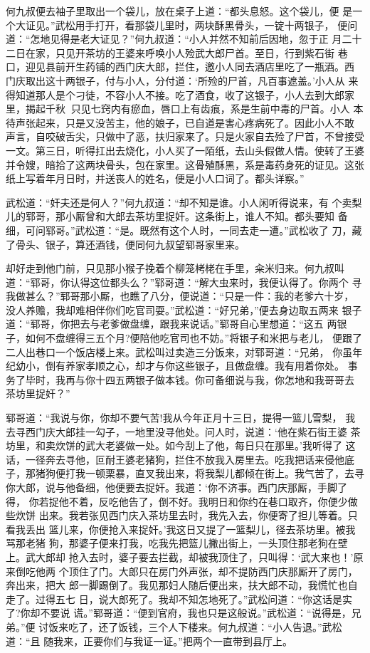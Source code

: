 何九叔便去袖子里取出一个袋儿，放在桌子上道：“都头息怒。这个袋儿，便
是一个大证见。”武松用手打开，看那袋儿里时，两块酥黑骨头，一锭十两银子，
便问道：“怎地见得是老大证见？”何九叔道：“小人并然不知前后因地，忽于正
月二十二日在家，只见开茶坊的王婆来呼唤小人殓武大郎尸首。至日，行到紫石街
巷口，迎见县前开生药铺的西门庆大郎，拦住，邀小人同去酒店里吃了一瓶酒。西
门庆取出这十两银子，付与小人，分付道：‘所殓的尸首，凡百事遮盖。’小人从
来得知道那人是个刁徒，不容小人不接。吃了酒食，收了这银子，小人去到大郎家
里，揭起千秋，只见七窍内有瘀血，唇口上有齿痕，系是生前中毒的尸首。小人
本待声张起来，只是又没苦主，他的娘子，已自道是害心疼病死了。因此小人不敢
声言，自咬破舌尖，只做中了恶，扶归家来了。只是火家自去殓了尸首，不曾接受
一文。第三日，听得扛出去烧化，小人买了一陌纸，去山头假做人情。使转了王婆
并令嫂，暗拾了这两块骨头，包在家里。这骨殖酥黑，系是毒药身死的证见。这张
纸上写着年月日时，并送丧人的姓名，便是小人口词了。都头详察。”

武松道：“奸夫还是何人？”何九叔道：“却不知是谁。小人闲听得说来，有
个卖梨儿的郓哥，那小厮曾和大郎去茶坊里捉奸。这条街上，谁人不知。都头要知
备细，可问郓哥。”武松道：“是。既然有这个人时，一同去走一遭。”武松收了
刀，藏了骨头、银子，算还酒钱，便同何九叔望郓哥家里来。

却好走到他门前，只见那小猴子挽着个柳笼栲栳在手里，籴米归来。何九叔叫
道：“郓哥，你认得这位都头么？”郓哥道：“解大虫来时，我便认得了。你两个
寻我做甚么？”郓哥那小厮，也瞧了八分，便说道：“只是一件：我的老爹六十岁，
没人养赡，我却难相伴你们吃官司耍。”武松道：“好兄弟，”便去身边取五两来
银子道：“郓哥，你把去与老爹做盘缠，跟我来说话。”郓哥自心里想道：“这五
两银子，如何不盘缠得三五个月?便陪他吃官司也不妨。”将银子和米把与老儿，
便跟了二人出巷口一个饭店楼上来。武松叫过卖造三分饭来，对郓哥道：“兄弟，
你虽年纪幼小，倒有养家孝顺之心，却才与你这些银子，且做盘缠。我有用着你处。
事务了毕时，我再与你十四五两银子做本钱。你可备细说与我，你怎地和我哥哥去
茶坊里捉奸？”

郓哥道：“我说与你，你却不要气苦!我从今年正月十三日，提得一篮儿雪梨，
我去寻西门庆大郎挂一勾子，一地里没寻他处。问人时，说道：‘他在紫石街王婆
茶坊里，和卖炊饼的武大老婆做一处。如今刮上了他，每日只在那里。’我听得了
这话，一径奔去寻他，叵耐王婆老猪狗，拦住不放我入房里去。吃我把话来侵他底
子，那猪狗便打我一顿栗暴，直叉我出来，将我梨儿都倾在街上。我气苦了，去寻
你大郎，说与他备细，他便要去捉奸。我道：‘你不济事。西门庆那厮，手脚了得，
你若捉他不着，反吃他告了，倒不好。我明日和你约在巷口取齐，你便少做些炊饼
出来。我若张见西门庆入茶坊里去时，我先入去，你便寄了担儿等着。只看我丢出
篮儿来，你便抢入来捉奸。’我这日又提了一篮梨儿，径去茶坊里。被我骂那老猪
狗，那婆子便来打我，吃我先把篮儿撇出街上，一头顶住那老狗在壁上。武大郎却
抢入去时，婆子要去拦截，却被我顶住了，只叫得：‘武大来也！’原来倒吃他两
个顶住了门。大郎只在房门外声张，却不提防西门庆那厮开了房门，奔出来，把大
郎一脚踢倒了。我见那妇人随后便出来，扶大郎不动，我慌忙也自走了。过得五七
日，说大郎死了。我却不知怎地死了。”武松问道：“你这话是实了?你却不要说
谎。”郓哥道：“便到官府，我也只是这般说。”武松道：“说得是，兄弟。”便
讨饭来吃了，还了饭钱，三个人下楼来。何九叔道：“小人告退。”武松道：“且
随我来，正要你们与我证一证。”把两个一直带到县厅上。

